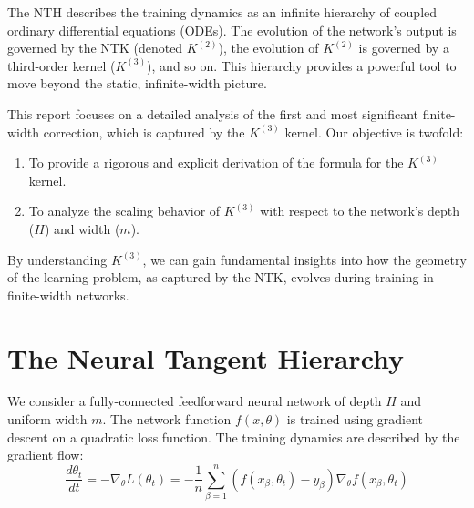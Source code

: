 \documentclass{article}
\begin{document}
The NTH describes the training dynamics as an infinite hierarchy of coupled ordinary differential equations (ODEs). The evolution of the network's output is governed by the NTK (denoted $K^{(2)}$), the evolution of $K^{(2)}$ is governed by a third-order kernel ($K^{(3)}$), and so on. This hierarchy provides a powerful tool to move beyond the static, infinite-width picture.

This report focuses on a detailed analysis of the first and most significant finite-width correction, which is captured by the $K^{(3)}$ kernel. Our objective is twofold:
\begin{enumerate}
    \item To provide a rigorous and explicit derivation of the formula for the $K^{(3)}$ kernel.
    \item To analyze the scaling behavior of $K^{(3)}$ with respect to the network's depth ($H$) and width ($m$).
\end{enumerate}
By understanding $K^{(3)}$, we can gain fundamental insights into how the geometry of the learning problem, as captured by the NTK, evolves during training in finite-width networks.

\section{The Neural Tangent Hierarchy}

We consider a fully-connected feedforward neural network of depth $H$ and uniform width $m$. The network function $f(x, \theta)$ is trained using gradient descent on a quadratic loss function. The training dynamics are described by the gradient flow:
\begin{equation}
\frac{d\theta_t}{dt} = -\nabla_\theta L(\theta_t) = -\frac{1}{n} \sum_{\beta=1}^n (f(x_\beta, \theta_t) - y_\beta) \nabla_\theta f(x_\beta, \theta_t)
\end{equation}
\end{document}

